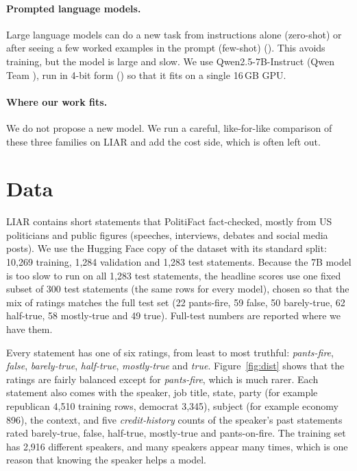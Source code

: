 \documentclass{nle}
\begin{document}
\paragraph{Prompted language models.} Large language models can do a new task from instructions alone
(zero-shot) or after seeing a few worked examples in the prompt (few-shot) (\cite{brown20}). This avoids
training, but the model is large and slow. We use Qwen2.5-7B-Instruct (Qwen Team ), run in 4-bit
form (\cite{dettmers23}) so that it fits on a single 16\,GB GPU.

\paragraph{Where our work fits.} We do not propose a new model. We run a careful, like-for-like comparison of
these three families on LIAR and add the cost side, which is often left out.

\section{Data}

LIAR contains short statements that PolitiFact fact-checked, mostly from US politicians and public figures
(speeches, interviews, debates and social media posts). We use the Hugging Face copy of the dataset with its
standard split: 10,269 training, 1,284 validation and 1,283 test statements. Because the 7B model is too slow
to run on all 1,283 test statements, the headline scores use one fixed subset of 300 test statements
(the same rows for every model), chosen so that the mix of ratings matches the full test set (22 pants-fire,
59 false, 50 barely-true, 62 half-true, 58 mostly-true and 49 true). Full-test numbers are reported where we
have them.

Every statement has one of six ratings, from least to most truthful: \emph{pants-fire}, \emph{false},
\emph{barely-true}, \emph{half-true}, \emph{mostly-true} and \emph{true}. Figure~\ref{fig:dist} shows that the
ratings are fairly balanced except for \emph{pants-fire}, which is much rarer. Each statement also comes with
the speaker, job title, state, party (for example republican 4,510 training rows, democrat 3,345), subject (for
example economy 896), the context, and five \emph{credit-history} counts of the speaker's past statements
rated barely-true, false, half-true, mostly-true and pants-on-fire. The training set has 2,916 different
speakers, and many speakers appear many times, which is one reason that knowing the speaker helps a model.
\end{document}
